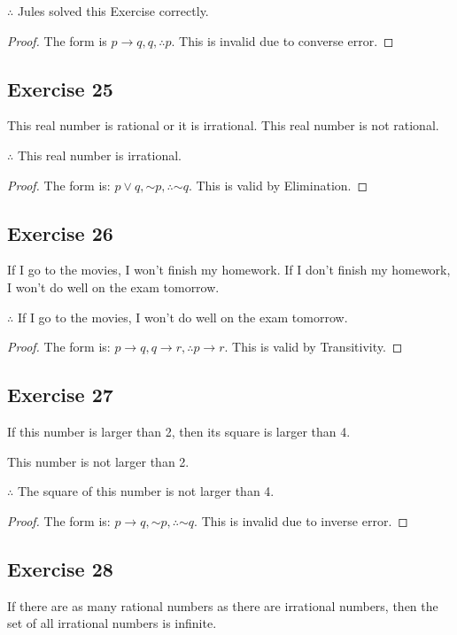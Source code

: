 \documentclass[14pt]{extarticle}
\begin{document}
$\therefore$ Jules solved this Exercise correctly.

\begin{proof} The form is $p \to q, q, \therefore p$. This is invalid due to
converse error. \end{proof}

\subsection{Exercise 25} This real number is rational or it is irrational.
This real number is not rational.

$\therefore$ This real number is irrational.

\begin{proof} The form is: $p \vee q, {\sim p}, \therefore {\sim q}$. This is
valid by Elimination. \end{proof}

\subsection{Exercise 26} If I go to the movies, I won’t finish my homework.
If I don’t finish my homework, I won’t do well on the exam tomorrow.

$\therefore$ If I go to the movies, I won’t do well on the exam tomorrow.

\begin{proof} The form is: $p \to q, q \to r, \therefore p \to r$. This is valid
by Transitivity. \end{proof}

\subsection{Exercise 27} If this number is larger than 2, then its square is
larger than 4.

This number is not larger than 2.

$\therefore$ The square of this number is not larger than 4.

\begin{proof} The form is: $p \to q, {\sim p}, \therefore {\sim q}$. This is
invalid due to inverse error. \end{proof}

\subsection{Exercise 28} If there are as many rational numbers as there are
irrational numbers, then the set of all irrational numbers is infinite.
\end{document}
